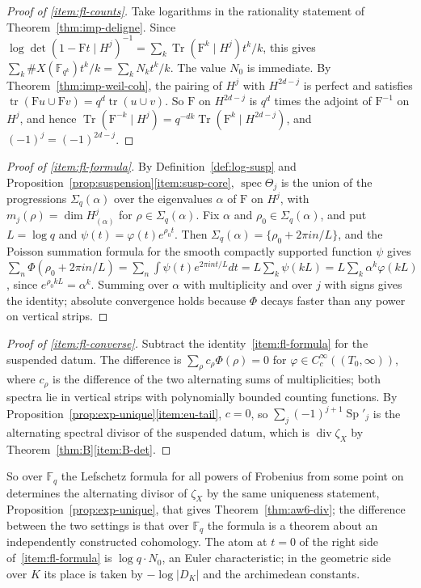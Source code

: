 \documentclass[11pt]{amsart}
\theoremstyle{plain}
\theoremstyle{definition}
\theoremstyle{remark}
\numberwithin{equation}{section}
\newcommand{\F}{\mathbb{F}}
\DeclareMathOperator{\Tr}{Tr}
\DeclareMathOperator{\spec}{spec}
\DeclareMathOperator{\divisor}{div}
\begin{document}
\begin{proof}[Proof of \ref{item:fl-counts}]
Take logarithms in the rationality statement of
Theorem~\ref{thm:imp-deligne}. Since
$\log\det(1-\mathrm Ft\mid H^j)^{-1}=\sum_k\Tr(\mathrm F^k\mid H^j)
t^k/k$, this gives $\sum_k\#X(\F_{q^k})t^k/k=\sum_kN_kt^k/k$. The value $N_0$ is
immediate. By Theorem~\ref{thm:imp-weil-coh}, the pairing of $H^j$
with $H^{2d-j}$ is perfect and satisfies
$\operatorname{tr}(\mathrm Fu\cup\mathrm Fv)=
q^d\operatorname{tr}(u\cup v)$. So $\mathrm F$ on $H^{2d-j}$ is $q^d$
times the adjoint of $\mathrm F^{-1}$ on $H^j$, and hence
$\Tr(\mathrm F^{-k}\mid H^j)=q^{-dk}\Tr(\mathrm F^k\mid H^{2d-j})$, and
$(-1)^j=(-1)^{2d-j}$.
\end{proof}

\begin{proof}[Proof of \ref{item:fl-formula}]
By Definition~\ref{def:log-susp} and
Proposition~\ref{prop:suspension}\ref{item:susp-core},
$\spec\Theta_j$ is the union of the progressions $\Sigma_q(\alpha)$
over the eigenvalues $\alpha$ of $\mathrm F$ on $H^j$, with
$m_j(\rho)=\dim H^j_{(\alpha)}$ for $\rho\in\Sigma_q(\alpha)$. Fix
$\alpha$ and $\rho_0\in\Sigma_q(\alpha)$, and put $L=\log q$ and
$\psi(t)=\varphi(t)e^{\rho_0t}$. Then $\Sigma_q(\alpha)=\{\rho_0
+2\pi in/L\}$, and the Poisson summation formula for the smooth
compactly supported function $\psi$ gives
$\sum_n\Phi(\rho_0+2\pi in/L)=\sum_n\int\psi(t)e^{2\pi int/L}dt
=L\sum_k\psi(kL)=L\sum_k\alpha^k\varphi(kL)$, since
$e^{\rho_0kL}=\alpha^k$. Summing over $\alpha$ with multiplicity and
over $j$ with signs gives the identity; absolute convergence holds
because $\Phi$ decays faster than any power on vertical strips.
\end{proof}

\begin{proof}[Proof of \ref{item:fl-converse}]
Subtract the identity~\ref{item:fl-formula} for the suspended datum. The
difference is $\sum_\rho c_\rho\Phi(\rho)=0$ for
$\varphi\in C_c^\infty((T_0,\infty))$, where $c_\rho$ is the difference
of the two alternating sums of multiplicities; both spectra lie in
vertical strips with polynomially bounded counting functions. By
Proposition~\ref{prop:exp-unique}\ref{item:eu-tail}, $c=0$, so
$\sum_j(-1)^{j+1}\operatorname{Sp}'_j$ is the alternating spectral
divisor of the suspended datum, which is $\divisor\zeta_X$ by
Theorem~\ref{thm:B}\ref{item:B-det}.
\end{proof}

So over $\F_q$ the Lefschetz formula for all powers of Frobenius from
some point on determines the alternating divisor of $\zeta_X$ by the
same uniqueness statement, Proposition~\ref{prop:exp-unique}, that
gives Theorem~\ref{thm:aw6-div}; the difference between the two
settings is that over $\F_q$ the formula is a theorem about an
independently constructed cohomology. The atom at $t=0$ of the right
side of~\ref{item:fl-formula} is $\log q\cdot N_0$, an Euler
characteristic; in the geometric side over $K$ its place is taken by
$-\log|D_K|$ and the archimedean constants.
\end{document}
